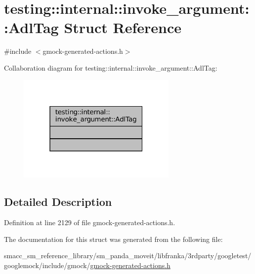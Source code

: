 \hypertarget{structtesting_1_1internal_1_1invoke__argument_1_1AdlTag}{}\section{testing\+:\+:internal\+:\+:invoke\+\_\+argument\+:\+:Adl\+Tag Struct Reference}
\label{structtesting_1_1internal_1_1invoke__argument_1_1AdlTag}


{\ttfamily \#include $<$gmock-\/generated-\/actions.\+h$>$}



Collaboration diagram for testing\+:\+:internal\+:\+:invoke\+\_\+argument\+:\+:Adl\+Tag\+:
\nopagebreak
\begin{figure}[H]
\begin{center}
\leavevmode
\includegraphics[width=220pt]{structtesting_1_1internal_1_1invoke__argument_1_1AdlTag__coll__graph}
\end{center}
\end{figure}


\subsection{Detailed Description}


Definition at line 2129 of file gmock-\/generated-\/actions.\+h.



The documentation for this struct was generated from the following file\+:\begin{DoxyCompactItemize}
\item 
smacc\+\_\+sm\+\_\+reference\+\_\+library/sm\+\_\+panda\+\_\+moveit/libfranka/3rdparty/googletest/googlemock/include/gmock/\hyperlink{gmock-generated-actions_8h}{gmock-\/generated-\/actions.\+h}\end{DoxyCompactItemize}
